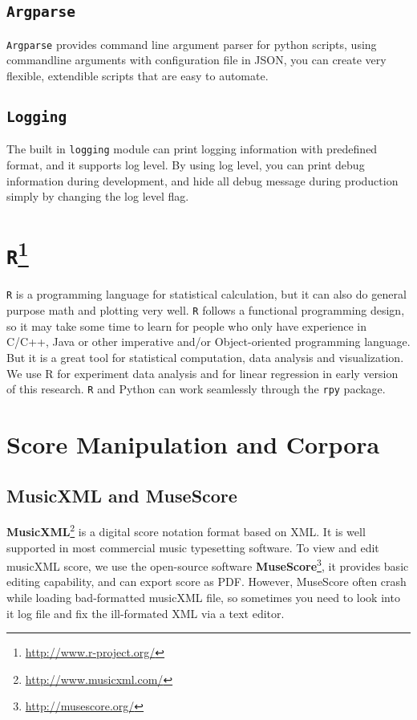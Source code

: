    \subsection*{\texttt{Argparse}}
   \texttt{Argparse} provides command line argument parser for python scripts, using commandline arguments with configuration file in JSON, you can create very flexible, extendible scripts that are easy to automate.

   \subsection*{\texttt{Logging}}
   The built in \texttt{logging} module can print logging information with predefined format, and it supports log level. By using log level, you can print debug information during development, and hide all debug message during production simply by changing the log level flag.

   \section*{\texttt{R}\footnote{\url{http://www.r-project.org/}}}
   \texttt{R} is a programming language for statistical calculation, but it can also do general purpose math and plotting very well. \texttt{R} follows a functional programming design, so it may take some time to learn for people who only have experience in C/C++, Java or other imperative and/or Object-oriented programming language. But it is a great tool for statistical computation, data analysis and visualization. We use R for experiment data analysis and for linear regression in early version of this research. \texttt{R} and Python can work seamlessly through the \texttt{rpy} package.

\section*{Score Manipulation and Corpora}
\subsection*{MusicXML and MuseScore}
\textbf{MusicXML}\footnote{\url{http://www.musicxml.com/}} is a digital score notation format based on XML. It is well supported in most commercial music typesetting software. %
To view and edit musicXML score, we use the open-source software \textbf{MuseScore}\footnote{\url{http://musescore.org/}}, it provides basic editing capability, and can export score as PDF. However, MuseScore often crash while loading bad-formatted musicXML file, so sometimes you need to look into it log file and fix the ill-formated XML via a text editor.
